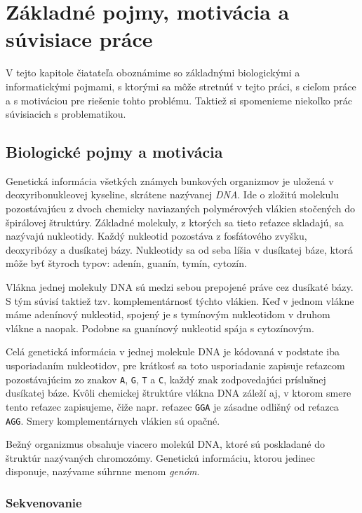\chapter{Základné pojmy, motivácia a súvisiace práce}

V tejto kapitole čiatateľa oboznámime so základnými biologickými
a informatickými pojmami, s ktorými sa môže stretnúť v tejto práci, s cieľom práce
a s motiváciou pre riešenie tohto problému. Taktiež si spomenieme niekoľko
prác súvisiacich s problematikou.

\section{Biologické pojmy a motivácia}

Genetická informácia všetkých známych bunkových organizmov je uložená v
deoxyribonukleovej kyseline, skrátene nazývanej \emph{DNA}. Ide o zložitú molekulu
pozostávajúcu z dvoch chemicky naviazaných polymérových vlákien stočených
do špirálovej štruktúry. Základné molekuly, z ktorých sa tieto reťazce
skladajú, sa nazývajú nukleotidy. Každý nukleotid pozostáva
z fosfátového zvyšku, deoxyribózy a dusíkatej bázy. Nukleotidy sa od seba líšia
v dusíkatej báze, ktorá môže byť štyroch typov: adenín, guanín, tymín, cytozín.

Vlákna jednej molekuly DNA sú medzi sebou prepojené práve cez dusíkaté bázy.
S tým súvisí taktiež tzv. komplementárnosť týchto vlákien. Keď v jednom vlákne
máme adenínový nukleotid, spojený je s tymínovým nukleotidom v druhom vlákne
a naopak. Podobne sa guanínový nukleotid spája s cytozínovým.

Celá genetická informácia v jednej molekule DNA je kódovaná v podstate iba usporiadaním nukleotidov,
pre krátkosť sa toto usporiadanie zapisuje reťazcom pozostávajúcim
zo znakov \verb_A_, \verb_G_, \verb_T_ a \verb_C_, každý znak zodpovedajúci
príslušnej dusíkatej báze. Kvôli chemickej štruktúre vlákna DNA záleží aj,
v ktorom smere tento reťazec zapisujeme, čiže napr. reťazec \verb_GGA_ je
zásadne odlišný od reťazca \verb_AGG_. Smery komplementárnych vlákien sú opačné.

Bežný organizmus obsahuje viacero molekúl DNA, ktoré sú poskladané do štruktúr
nazývaných chromozómy. Genetickú informáciu, ktorou jedinec disponuje,
nazývame súhrnne menom \emph{genóm}.

\subsection{Sekvenovanie}

